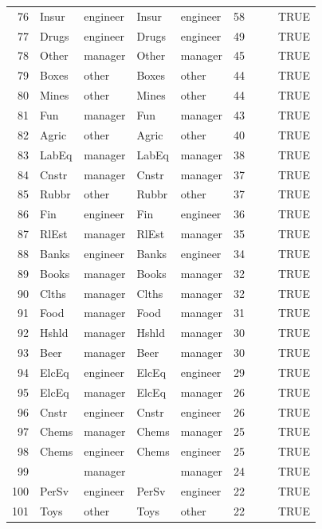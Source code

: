 \begin{table}[ht]
\begin{tabular}{rllllrrrl}
  76 & Insur & engineer & Insur & engineer &  58 &  &  & TRUE \\ 
  77 & Drugs & engineer & Drugs & engineer &  49 &  &  & TRUE \\ 
  78 & Other & manager & Other & manager &  45 &  &  & TRUE \\ 
  79 & Boxes & other & Boxes & other &  44 &  &  & TRUE \\ 
  80 & Mines & other & Mines & other &  44 &  &  & TRUE \\ 
  81 & Fun & manager & Fun & manager &  43 &  &  & TRUE \\ 
  82 & Agric & other & Agric & other &  40 &  &  & TRUE \\ 
  83 & LabEq & manager & LabEq & manager &  38 &  &  & TRUE \\ 
  84 & Cnstr & manager & Cnstr & manager &  37 &  &  & TRUE \\ 
  85 & Rubbr & other & Rubbr & other &  37 &  &  & TRUE \\ 
  86 & Fin & engineer & Fin & engineer &  36 &  &  & TRUE \\ 
  87 & RlEst & manager & RlEst & manager &  35 &  &  & TRUE \\ 
  88 & Banks & engineer & Banks & engineer &  34 &  &  & TRUE \\ 
  89 & Books & manager & Books & manager &  32 &  &  & TRUE \\ 
  90 & Clths & manager & Clths & manager &  32 &  &  & TRUE \\ 
  91 & Food & manager & Food & manager &  31 &  &  & TRUE \\ 
  92 & Hshld & manager & Hshld & manager &  30 &  &  & TRUE \\ 
  93 & Beer & manager & Beer & manager &  30 &  &  & TRUE \\ 
  94 & ElcEq & engineer & ElcEq & engineer &  29 &  &  & TRUE \\ 
  95 & ElcEq & manager & ElcEq & manager &  26 &  &  & TRUE \\ 
  96 & Cnstr & engineer & Cnstr & engineer &  26 &  &  & TRUE \\ 
  97 & Chems & manager & Chems & manager &  25 &  &  & TRUE \\ 
  98 & Chems & engineer & Chems & engineer &  25 &  &  & TRUE \\ 
  99 &  & manager &  & manager &  24 &  &  & TRUE \\ 
  100 & PerSv & engineer & PerSv & engineer &  22 &  &  & TRUE \\ 
  101 & Toys & other & Toys & other &  22 &  &  & TRUE \\ 

\end{tabular}
\end{table}
